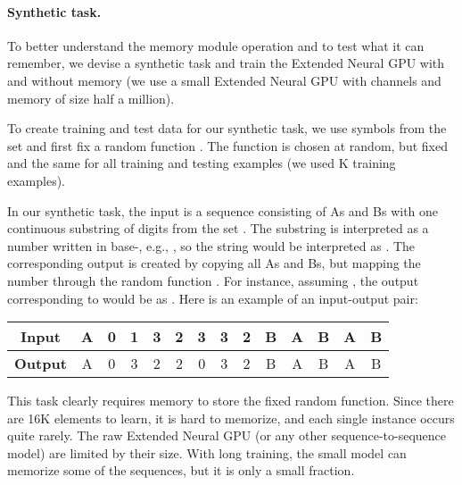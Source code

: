 \documentclass{article} \usepackage{iclr2017_conference,times}
\begin{document}
\paragraph{Synthetic task.}
To better understand the memory module operation and to test what
it can remember, we devise a synthetic task
and train the Extended Neural GPU with and without memory
(we use a small Extended Neural GPU with  channels and memory of size half a million).

To create training and test data for our synthetic task,
we use symbols from the set 
and first fix a random function . The function  is
chosen at random, but fixed and the same for all training and testing examples (we used K training examples).

In our synthetic task, the input is a sequence consisting of
As and Bs with one continuous substring of  digits from
the set . The substring is interpreted as a number
written in base-, e.g., , so the string
 would be interpreted as . The corresponding
output is created by copying all As and Bs, but mapping
the number through the random function . For instance,
assuming , the output corresponding to 
 would be  as .
Here is an example of an input-output pair:

\begin{center}
\begin{tabular}{|c||c|c|c|c|c|c|c|c|c|c|c|c|c|}
\hline
{\bf Input}  & A & 0 & 1 & 3 & 2 & 3 & 3 & 2 & B & A & B & A & B \\ \hline
{\bf Output} & A & 0 & 3 & 2 & 2 & 0 & 3 & 2 & B & A & B & A & B \\ \hline
\end{tabular}
\end{center}

This task clearly requires memory to store the fixed random function.
Since there are 16K elements to learn, it is hard to memorize,
and each single instance occurs quite rarely.
The raw Extended Neural GPU (or any other sequence-to-sequence model)
are limited by their size. With long training, the small model can
memorize some of the sequences, but it is only a small fraction.
\end{document}
